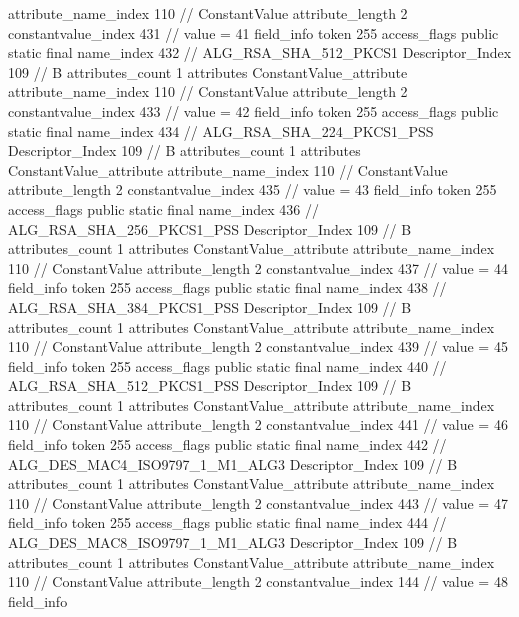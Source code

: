 {{{{{{{					attribute_name_index	110		// ConstantValue
					attribute_length	2
					constantvalue_index	431		// value = 41
				}
				}
			}
			field_info {
				token	255
				access_flags	public static final
				name_index	432		// ALG_RSA_SHA_512_PKCS1
				Descriptor_Index	109		// B
				attributes_count	1
				attributes {
				ConstantValue_attribute {
					attribute_name_index	110		// ConstantValue
					attribute_length	2
					constantvalue_index	433		// value = 42
				}
				}
			}
			field_info {
				token	255
				access_flags	public static final
				name_index	434		// ALG_RSA_SHA_224_PKCS1_PSS
				Descriptor_Index	109		// B
				attributes_count	1
				attributes {
				ConstantValue_attribute {
					attribute_name_index	110		// ConstantValue
					attribute_length	2
					constantvalue_index	435		// value = 43
				}
				}
			}
			field_info {
				token	255
				access_flags	public static final
				name_index	436		// ALG_RSA_SHA_256_PKCS1_PSS
				Descriptor_Index	109		// B
				attributes_count	1
				attributes {
				ConstantValue_attribute {
					attribute_name_index	110		// ConstantValue
					attribute_length	2
					constantvalue_index	437		// value = 44
				}
				}
			}
			field_info {
				token	255
				access_flags	public static final
				name_index	438		// ALG_RSA_SHA_384_PKCS1_PSS
				Descriptor_Index	109		// B
				attributes_count	1
				attributes {
				ConstantValue_attribute {
					attribute_name_index	110		// ConstantValue
					attribute_length	2
					constantvalue_index	439		// value = 45
				}
				}
			}
			field_info {
				token	255
				access_flags	public static final
				name_index	440		// ALG_RSA_SHA_512_PKCS1_PSS
				Descriptor_Index	109		// B
				attributes_count	1
				attributes {
				ConstantValue_attribute {
					attribute_name_index	110		// ConstantValue
					attribute_length	2
					constantvalue_index	441		// value = 46
				}
				}
			}
			field_info {
				token	255
				access_flags	public static final
				name_index	442		// ALG_DES_MAC4_ISO9797_1_M1_ALG3
				Descriptor_Index	109		// B
				attributes_count	1
				attributes {
				ConstantValue_attribute {
					attribute_name_index	110		// ConstantValue
					attribute_length	2
					constantvalue_index	443		// value = 47
				}
				}
			}
			field_info {
				token	255
				access_flags	public static final
				name_index	444		// ALG_DES_MAC8_ISO9797_1_M1_ALG3
				Descriptor_Index	109		// B
				attributes_count	1
				attributes {
				ConstantValue_attribute {
					attribute_name_index	110		// ConstantValue
					attribute_length	2
					constantvalue_index	144		// value = 48
				}
				}
			}
			field_info {
}}}}}
